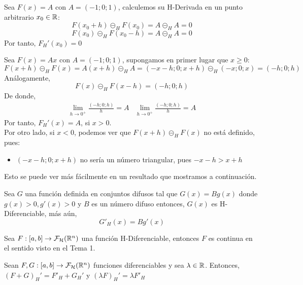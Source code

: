 \begin{ejemplo}
	Sea $F(x)=A$ con $A=(-1;0;1)$, calculemos su H-Derivada en un punto arbitrario $x_0 \in \mathbb R$: 
	\[
		F(x_0 + h) \circleddash_H F(x_0) = A \circleddash_H A = 0
	\]
	\[
		F(x_0) \circleddash_H F(x_0 - h) = A \circleddash_H A = 0
	\]
	Por tanto, $F_H'(x_0) = 0$
\end{ejemplo}

\begin{ejemplo}
	\label{ejemplo:hukuhara}
	Sea $F(x)=A x$ con $A=(-1; 0; 1)$, supongamos en primer lugar que $x \geq 0$:
	\[
		F(x + h) \circleddash_H F(x) = A(x + h) \circleddash_H A = (-x - h; 0; x+h) \circleddash_H (-x; 0; x) = (-h; 0; h)
	\]
	Análogamente, 
	\[
		F(x) \circleddash_H F(x - h) = (-h; 0; h)
	\]
	De donde,
	\[
	\begin{array}{c||c}
		\lim\limits_{h \rightarrow 0^+} \frac{(-h; 0; h)}{h}=A & \lim\limits_{h \rightarrow 0^+} \frac{(-h; 0; h)}{h}=A
	\end{array}
	\]
	Por tanto, $F_H'(x) = A $, si $x > 0$. \\
	Por otro lado, si $x<0$, podemos ver que $F(x+h) \circleddash_H F(x)$ no está definido, pues:
	
	\begin{itemize}
		\item $(-x-h; 0; x+h)$ no sería un número triangular, pues $-x-h > x+h$
	\end{itemize}

	Esto se puede ver más fácilmente en un resultado que mostramos a continuación.
\end{ejemplo}

\begin{proposicion}
	Sea $G$ una función definida en conjuntos difusos tal que $G(x)=B g(x)$ donde $g(x)>0, g'(x)>0$ y $B$ es un número difuso entonces, $G(x)$ es H-Diferenciable, más aún, 
	\[
		G'_H(x) = B g'(x)
	\]
\end{proposicion}

\begin{teorema} Sea  $F: [a, b] \rightarrow \mathcal{F}_\mathcal{H}(\mathbb R^n)$ una función H-Diferenciable, entonces $F$ es continua en el sentido visto en el Tema 1.
\end{teorema}

\begin{teorema}
	Sean $F, G : [a, b] \rightarrow \mathcal{F}_\mathcal{H}(\mathbb R^n)$ funciones diferenciables y sea $\lambda \in \mathbb R$. Entonces, $(F+G)_H' = F'_H + G_H'$ y $(\lambda F)_H' = \lambda F'_H$
\end{teorema}

